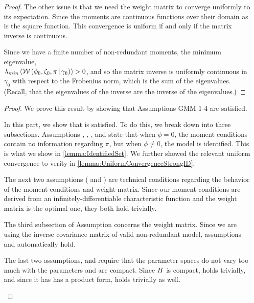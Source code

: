 \documentclass[11pt, letterpaper, twoside, final]{article}
\begin{document}
\begin{appendices}
\begin{proof}
    The other issue is that we need the weight matrix to converge uniformly to its expectation.
    Since the moments are continuous functions over their domain as is the square function.
    This convergence is uniform if and only if the matrix inverse is continuous.
    
    Since we have a finite number of non-redundant moments, the minimum eigenvalue, \\
    $\lambda_{min}\left(\mathcal{W}\left(\phi_0, \zeta_0, \pi \,\middle\vert\, \gamma_0\right)\right) > 0$, and so the matrix inverse
    is uniformly continuous in $\gamma_0$ with respect to the Frobenius norm, which is the sum of the eigenvalues.
    (Recall, that the eigenvalues of the inverse are the inverse of the eigenvalues.)


\end{proof}

\InferenceWeakID*

\begin{proof}
We prove this result by showing that Assumptions GMM 1-4 are satisfied.

\begin{proofpart}
    \label{part:main_theorem_proof_part1}
    In this part, we show that  is satisfied. 
    To do this, we break   down into three subsections.
    Assumptions , , , and  state
    that when $\phi = 0$, the moment conditions contain no information regarding $\pi$, but when $\phi \neq 0$,
    the model is identified.
    This is what we show in \cref{lemma:IdentifiedSet}.
    We further showed the relevant uniform convergence to verity  in
    \cref{lemma:UniformConvergenceStrongID}.
    
    The next two assumptions ( and ) are  technical conditions regarding
    the behavior of the moment conditions and weight matrix. 
    Since our moment conditions are derived from an infinitely-differentiable  characteristic function and the
    weight matrix is the optimal one, they both hold trivially.
    
    The third subsection of Assumption  concerns the weight matrix.
    Since we are using the inverse covariance matrix of valid non-redundant model, assumptions
     and  automatically hold.
    
    The last two assumptions,  and  require that the parameter spaces do
    not vary too much with the parameters and are compact.
    Since $H$ is compact,  holds trivially, and since it has  has a product form,
      holds trivially as well.
    

\end{proofpart}
\end{proof}
\end{appendices}
\end{document}

